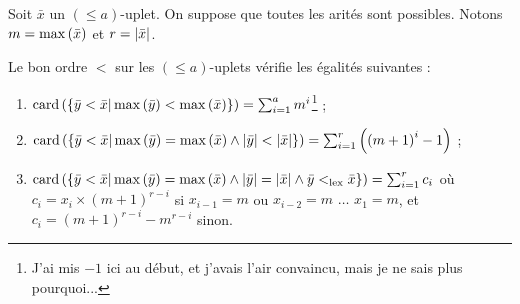 \documentclass{report}
\newcommand{\leqa}{\left( \leqslant a \right)}
\begin{document}
		\begin{prop}
			\label{prop:bon_ordre_combinatoire}
			Soit $\bar{x}$ un $\leqa$-uplet. On suppose que toutes les arités sont possibles. Notons $m = \max\left( \bar{x} \right)$ et $r = \left|\bar{x}\right|$.
			
			Le bon ordre $<$ sur les $\leqa$-uplets vérifie les égalités suivantes :
			
			\begin{enumerate}
				\item 	\label{itm:bon_ordre_combinatoire1} $\text{card}\left( \left\lbrace \bar{y} < \bar{x} | \max\left( \bar{y} \right) < \max\left( \bar{x} \right) \right\rbrace \right) = \sum_{i=1}^{a} m^i$\footnote{J'ai mis $-1$ ici au début, et j'avais l'air convaincu, mais je ne sais plus pourquoi...} ;
				\item 	\label{itm:bon_ordre_combinatoire2} $\text{card}\left( \left\lbrace \bar{y} < \bar{x} | \max\left( \bar{y} \right) = \max\left( \bar{x} \right) \wedge \left|\bar{y}\right| < \left|\bar{x}\right|  \right\rbrace \right) = \sum_{i=1}^{r} \left( \left(m+1\right)^i -1 \right)$ ; 
				\item 	\label{itm:bon_ordre_combinatoire3} $\text{card}\left( \left\lbrace \bar{y} < \bar{x} | \max\left( \bar{y} \right) = \max\left( \bar{x} \right) \wedge \left|\bar{y}\right| = \left|\bar{x}\right| \wedge \bar{y} <_{\text{lex}} \bar{x}  \right\rbrace \right) = \sum_{i=1}^{r} c_i$ où $c_i = x_i \times \left(m+1\right)^{r-i}$ si $x_{i-1} = m$ ou $x_{i-2} = m$ $\dots$ $x_{1} = m$, et $c_i = \left(m+1\right)^{r-i}-m^{r-i}$ sinon. 
			\end{enumerate}
		\end{prop}
		
\end{document}

